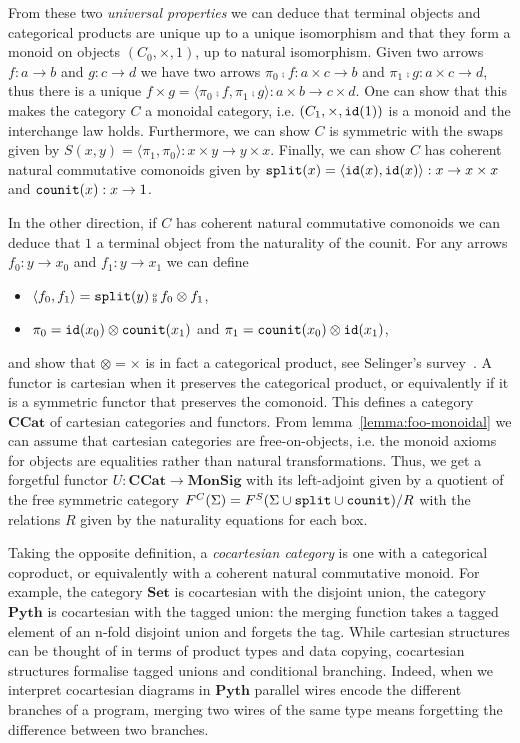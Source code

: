 From these two \emph{universal properties} we can deduce that terminal objects and categorical products are unique up to a unique isomorphism and that they form a monoid on objects $(C_0, \times, 1)$, up to natural isomorphism.
Given two arrows $f : a \to b$ and $g : c \to d$ we have two arrows $\pi_0 \fcmp f : a \times c \to b$ and $\pi_1 \fcmp g : a \times c \to d$, thus there is a unique $f \times  g = \langle \pi_0 \fcmp f, \pi_1 \fcmp g \rangle : a \times b \to c \times d$.
One can show that this makes the category $C$ a monoidal category, i.e. $(C_1, \times, \mathtt{id}(1))$ is a monoid and the interchange law holds.
Furthermore, we can show $C$ is symmetric with the swaps given by $S(x, y) = \langle \pi_1, \pi_0 \rangle : x \times y \to y \times x$.
Finally, we can show $C$ has coherent natural commutative comonoids given by $\mathtt{split}(x) = \langle \mathtt{id}(x), \mathtt{id}(x) \rangle : x \to x \times x$ and $\mathtt{counit}(x) : x \to 1$.

In the other direction, if $C$ has coherent natural commutative comonoids we can deduce that $1$ a terminal object from the naturality of the counit.
For any arrows $f_0 : y \to x_0$ and $f_1 : y \to x_1$ we can define
\begin{itemize}
\item $\langle f_0, f_1 \rangle = \ttsplit(y) \fcmp f_0 \otimes f_1$,
\item $\pi_0 = \mathtt{id}(x_0) \otimes \mathtt{counit}(x_1)$ and $\pi_1 = \mathtt{counit}(x_0) \otimes \mathtt{id}(x_1)$,
\end{itemize}
and show that $\otimes = \times$ is in fact a categorical product, see Selinger's survey~\cite[Section 6.1]{Selinger10}.
A functor is cartesian when it preserves the categorical product, or equivalently if it is a symmetric functor that preserves the comonoid.
This defines a category $\mathbf{CCat}$ of cartesian categories and functors.
From lemma~\ref{lemma:foo-monoidal} we can assume that cartesian categories are free-on-objects, i.e. the monoid axioms for objects are equalities rather than natural transformations.
Thus, we get a forgetful functor $U : \mathbf{CCat} \to \mathbf{MonSig}$ with its left-adjoint given by a quotient of the free symmetric category $F^C(\Sigma) = F^S(\Sigma \cup \mathtt{split} \cup \mathtt{counit}) / R$ with the relations $R$ given by the naturality equations for each box.

Taking the opposite definition, a \emph{cocartesian category} is one with a categorical coproduct, or equivalently with a coherent natural commutative monoid.
For example, the category $\mathbf{Set}$ is cocartesian with the disjoint union, the category $\mathbf{Pyth}$ is cocartesian with the tagged union: the merging function takes a tagged element of an n-fold disjoint union and forgets the tag.
While cartesian structures can be thought of in terms of product types and data copying, cocartesian structures formalise tagged unions and conditional branching.
Indeed, when we interpret cocartesian diagrams in $\mathbf{Pyth}$ parallel wires encode the different branches of a program, merging two wires of the same type means forgetting the difference between two branches.

